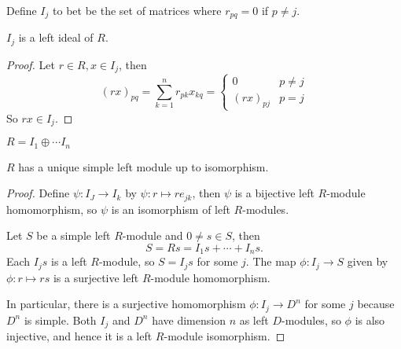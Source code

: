   Define $I_j$ to bet be the set of matrices where $r_{pq} = 0$ if $p\neq j$.
  \begin{prop}
    $I_j$ is a left ideal of $R$.
  \end{prop}
  \begin{proof}
    Let $r \in R, x\in I_j$, then
    \[ (rx)_{pq} = \sum_{k=1}^n r_{pk}x_{kq} = \begin{cases} 0 & p \neq j \\ (rx)_{pj} & p = j \end{cases} \]
    So $rx \in I_j$.
  \end{proof}

   $R = I_1\oplus \cdots I_n$

  \begin{lemma}
    $R$ has a unique simple left module up to isomorphism.
  \end{lemma}
  \begin{proof}
    Define $\psi: I_J \to I_k$ by $\psi:r \mapsto re_{jk}$, then $\psi$ is a
    bijective left $R$-module homomorphism, so $\psi$ is an isomorphism of left
    $R$-modules.

    Let $S$ be a simple left $R$-module and $0\neq s \in S$, then
    \[ S = Rs = I_1s + \cdots + I_ns.\]
    Each $I_js$ is a left $R$-module, so $S=I_js$ for some $j$. The map
    $\phi:I_j \to S$ given by $\phi:r \mapsto rs$ is a surjective left
    $R$-module homomorphism.

    In particular, there is a surjective homomorphism $\phi:I_j \to D^n$ for
    some $j$ because $D^n$ is simple. Both $I_j$ and $D^n$ have dimension $n$
    as left $D$-modules, so $\phi$ is also injective, and hence it is a left
    $R$-module isomorphism.
  \end{proof}

